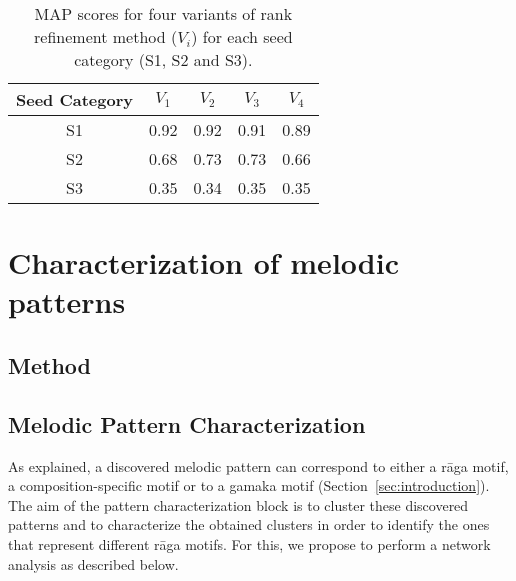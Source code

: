 \begin{table} 
	\centering
	\caption{MAP scores for four variants of rank refinement method ($V_i$) for each seed category (S1, S2 and S3).}
	\label{tab:meanAveragePrecision}
	
	\begin{tabular}{ c | c c c c}
		\hline\hline
		Seed Category   & $V_1$		&	$V_2$ & $V_3$	 &	$V_4$ 	\\	
		\hline
		S1 & 0.92    &	0.92		&	0.91    &	0.89\\
		S2 & 0.68    &	0.73		&	0.73    &	0.66\\
		S3 & 0.35    &	0.34    &	0.35    &	0.35\\
		\hline\hline
	\end{tabular}
	
\end{table}

%


\section{Characterization of melodic patterns}


\subsection{Method}

\subsection{Melodic Pattern Characterization}
\label{pattern_characterization}

As explained, a discovered melodic pattern can correspond to either a r\={a}ga motif, a composition-specific motif or to a gamaka motif (Section~\ref{sec:introduction}). The aim of the pattern characterization block is to cluster these discovered patterns and to characterize the obtained clusters in order to identify the ones that represent different r\={a}ga motifs. For this, we propose to perform a network analysis as described below.

